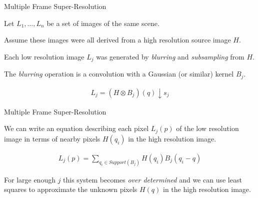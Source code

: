 \documentclass{beamer}
\begin{document}
\begin{frame}{Multiple Frame Super-Resolution}

Let \( {L_1,...,L_n} \) be a set of images of the same scene.

\vspace{0.3cm}

Assume these images were all derived from a high resolution source image \(H\).

\vspace{0.3cm}

Each low resolution image \(L_j\) was generated by \emph{blurring} and \emph{subsampling} from \(H\).

\vspace{0.3cm}

The \emph{blurring} operation is a convolution with a Gaussian (or similar) kernel \(B_j\).

\begin{figure}
\begin{equation}
\begin{aligned}
L_j = \left( H \otimes B_j \right) \left( q \right) \downarrow s_j
\end{aligned}
\end{equation}
\end{figure}

\end{frame}


\begin{frame}{Multiple Frame Super-Resolution}

We can write an equation describing each pixel \(L_j(p)\) of the low resolution image in terms of nearby pixels \(H(q_i)\) in the high resolution image.

\begin{figure}
\begin{equation}
\begin{aligned}
L_j(p) = \sum_{q_i \in Support(B_j)} H( q_i ) B_j( q_i - q )
\end{aligned}
\end{equation}
\end{figure}

For large enough \(j\) this system becomes \emph{over determined} and we can use least squares to approximate the unknown pixels \(H(q)\) in the high resolution image.

\end{frame}

\end{document}
